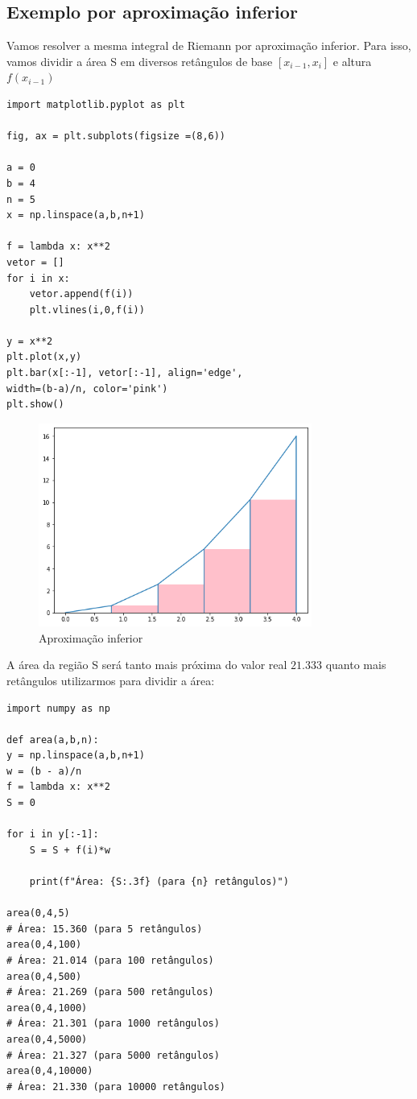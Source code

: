 \subsection{Exemplo por aproximação inferior}

Vamos resolver a mesma integral de Riemann por aproximação inferior. Para isso, vamos dividir a área S em diversos retângulos de base $[x_{i-1},x_{i}]$ e altura $f(x_{i-1})$

\begin{verbatim}
import matplotlib.pyplot as plt

fig, ax = plt.subplots(figsize =(8,6))

a = 0
b = 4
n = 5
x = np.linspace(a,b,n+1)

f = lambda x: x**2
vetor = []
for i in x:
	vetor.append(f(i))
	plt.vlines(i,0,f(i))

y = x**2
plt.plot(x,y)
plt.bar(x[:-1], vetor[:-1], align='edge', 
width=(b-a)/n, color='pink')
plt.show()
\end{verbatim}

\begin{figure}[H]
	\centering
	\includegraphics[width=0.8\textwidth]{./Imagens/Integral de Riemann/RI4.png} 
	\caption{Aproximação inferior}
	\label{fig:RI4}
\end{figure}

A área da região S será tanto mais próxima do valor real $21.333$ quanto mais retângulos utilizarmos para dividir a área:

\begin{verbatim}
import numpy as np

def area(a,b,n):
y = np.linspace(a,b,n+1)
w = (b - a)/n
f = lambda x: x**2
S = 0

for i in y[:-1]:
	S = S + f(i)*w 

	print(f"Área: {S:.3f} (para {n} retângulos)")

area(0,4,5)
# Área: 15.360 (para 5 retângulos)
area(0,4,100)
# Área: 21.014 (para 100 retângulos)
area(0,4,500)
# Área: 21.269 (para 500 retângulos)
area(0,4,1000)
# Área: 21.301 (para 1000 retângulos)
area(0,4,5000)
# Área: 21.327 (para 5000 retângulos)
area(0,4,10000)
# Área: 21.330 (para 10000 retângulos)
\end{verbatim}

